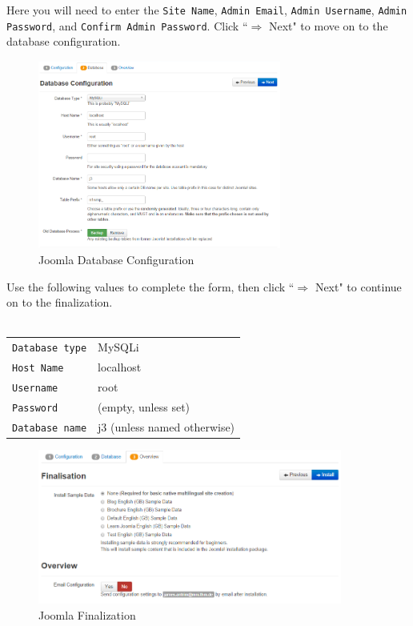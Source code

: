\documentclass[]{report}
\begin{document}
\noindent
Here you will need to enter the \texttt{Site Name}, \texttt{Admin Email}, \texttt{Admin Username}, \texttt{Admin Password}, and \texttt{Confirm Admin Password}. Click ``$\Rightarrow$ Next" to move on to the database configuration.\\

\begin{figure}[h] 
	\centering
	\includegraphics[width=8cm]{j3databaseconfiguration.png}
	\caption{Joomla Database Configuration}
	\label{fig:j3databaseconfiguration}
\end{figure}

\noindent
Use the following values to complete the form, then click ``$\Rightarrow$ Next" to continue on to the finalization.\\
\\
\begin{tabular}{l l}
	\texttt{Database type} & MySQLi\\
	\texttt{Host Name} & localhost\\
	\texttt{Username} & root\\
	\texttt{Password} & (empty, unless set)\\
	\texttt{Database name} & j3 (unless named otherwise)\\
\end{tabular}

\newpage

\begin{figure}[h]
	\centering
	\includegraphics[width=10cm]{j3finalization.png}
	\caption{Joomla Finalization}
	\label{fig:j3finalization}
\end{figure}
\end{document}
